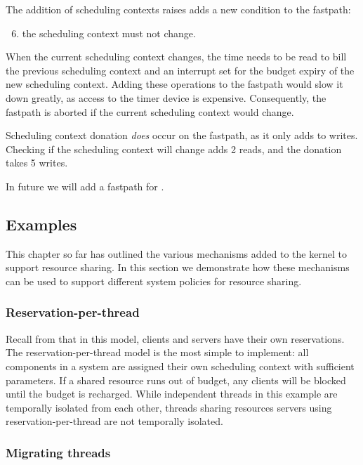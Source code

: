 The addition of scheduling contexts raises adds a new condition to the fastpath:
\begin{enumerate}
    \setcounter{enumi}{5}
    \item the scheduling context must not change.
\end{enumerate}
When the current scheduling context changes, the time needs to be read to bill the previous scheduling context and an interrupt set for the budget expiry of the new scheduling context.
Adding these operations to the fastpath would slow it down greatly, as access to the timer device is expensive.
Consequently, the fastpath is aborted if the current scheduling context would change.

Scheduling context donation \emph{does} occur on the fastpath, as it only adds to writes.
Checking if the scheduling context will change adds 2 reads, and the donation takes 5 writes.

In future we will add a fastpath for \sendwait.

\subsection{Examples}

This chapter so far has outlined the various mechanisms added to the kernel to support resource sharing.
In this section we demonstrate how these mechanisms can be used to support different system policies for resource sharing.

\subsubsection{Reservation-per-thread}

Recall from  that in this model, clients and servers have their own reservations.
The reservation-per-thread model is the most simple to implement: all components in a system are assigned their own scheduling context with sufficient parameters.
If a shared resource runs out of budget, any clients will be blocked until the budget is recharged.
While independent threads in this example are temporally isolated from each other, threads sharing resources servers using reservation-per-thread are not temporally isolated.

\subsubsection{Migrating threads}

